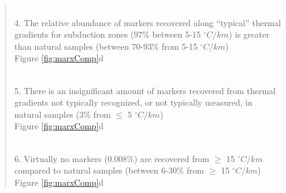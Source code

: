 \begin{quote}
\strut \\
\hspace*{0.333em}4. The relative abundance of markers recovered along ``typical'' thermal\\
\hspace*{0.333em}\hspace*{0.333em}\hspace*{0.333em}\hspace*{0.333em}gradients for subduction zones (97\% between 5-15 \(^\circ C/km\)) is greater\\
\hspace*{0.333em}\hspace*{0.333em}\hspace*{0.333em}\hspace*{0.333em}than natural samples (between 70-93\% from 5-15 \(^\circ C/km\))\\
\hspace*{0.333em}\hspace*{0.333em}\hspace*{0.333em}\hspace*{0.333em}Figure \ref{fig:marxComp}d\\
\strut \\
\hspace*{0.333em}5. There is an insignificant amount of markers recovered from thermal\\
\hspace*{0.333em}\hspace*{0.333em}\hspace*{0.333em}\hspace*{0.333em}gradients not typically recognized, or not typically measured, in\\
\hspace*{0.333em}\hspace*{0.333em}\hspace*{0.333em}\hspace*{0.333em}natural samples (3\% from \(\leq\) 5 \(^\circ C/km\))\\
\hspace*{0.333em}\hspace*{0.333em}\hspace*{0.333em}\hspace*{0.333em}Figure \ref{fig:marxComp}d\\
\strut \\
\hspace*{0.333em}6. Virtually no markers (0.008\%) are recovered from \(\geq\) 15 \(^\circ C/km\)\\
\hspace*{0.333em}\hspace*{0.333em}\hspace*{0.333em}\hspace*{0.333em}compared to natural samples (between 6-30\% from \(\geq\) 15 \(^\circ C/km\))\\
\hspace*{0.333em}\hspace*{0.333em}\hspace*{0.333em}\hspace*{0.333em}Figure \ref{fig:marxComp}d
\end{quote}



